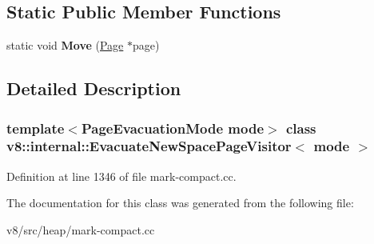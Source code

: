 \subsection*{Static Public Member Functions}
\begin{DoxyCompactItemize}
\item 
\mbox{\label{classv8_1_1internal_1_1EvacuateNewSpacePageVisitor_a6b5981f0247dc5a128d5c66cf05bc0d4}} 
static void {\bfseries Move} (\mbox{\hyperlink{classv8_1_1internal_1_1Page}{Page}} $\ast$page)
\end{DoxyCompactItemize}


\subsection{Detailed Description}
\subsubsection*{template$<$Page\+Evacuation\+Mode mode$>$\newline
class v8\+::internal\+::\+Evacuate\+New\+Space\+Page\+Visitor$<$ mode $>$}



Definition at line 1346 of file mark-\/compact.\+cc.



The documentation for this class was generated from the following file\+:\begin{DoxyCompactItemize}
\item 
v8/src/heap/mark-\/compact.\+cc\end{DoxyCompactItemize}
